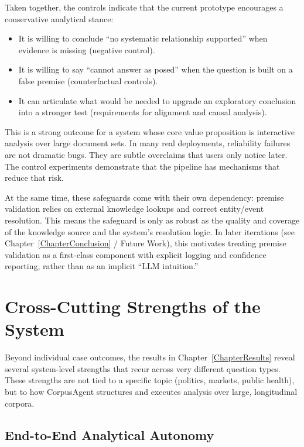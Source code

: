 Taken together, the controls indicate that the current prototype encourages a conservative analytical stance:

\begin{itemize}
    \item It is willing to conclude “no systematic relationship supported” when evidence is missing (negative control).
    \item It is willing to say “cannot answer as posed” when the question is built on a false premise (counterfactual controls).
    \item It can articulate what would be needed to upgrade an exploratory conclusion into a stronger test (requirements for alignment and causal analysis).
\end{itemize}

This is a strong outcome for a system whose core value proposition is interactive analysis over large document sets. In many real deployments, reliability failures are not dramatic bugs. They are subtle overclaims that users only notice later. The control experiments demonstrate that the pipeline has mechanisms that reduce that risk.

At the same time, these safeguards come with their own dependency: premise validation relies on external knowledge lookups and correct entity/event resolution. This means the safeguard is only as robust as the quality and coverage of the knowledge source and the system’s resolution logic. In later iterations (see Chapter~\ref{ChapterConclusion} / Future Work), this motivates treating premise validation as a first-class component with explicit logging and confidence reporting, rather than as an implicit “LLM intuition.”


\section{Cross-Cutting Strengths of the System}

Beyond individual case outcomes, the results in Chapter~\ref{ChapterResults} reveal several system-level strengths that recur across very different question types. These strengths are not tied to a specific topic (politics, markets, public health), but to how CorpusAgent structures and executes analysis over large, longitudinal corpora.

\subsection{End-to-End Analytical Autonomy}

